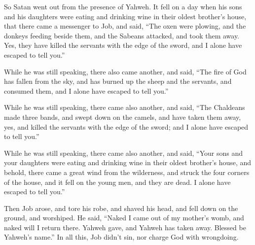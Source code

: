 {\par }{\PP So Satan went out from the presence of Yahweh.
It fell on a day when his sons and his daughters were eating and drinking wine in their oldest brother’s house,
that there came a messenger to Job, and said, “The oxen were plowing, and the donkeys feeding beside them,
and the Sabeans attacked, and took them away. Yes, they have killed the servants with the edge of the sword, and I alone have escaped to tell you.”
\par }{\PP {}While he was still speaking, there also came another, and said, “The fire of God has fallen from the sky, and has burned up the sheep and the servants, and consumed them, and I alone have escaped to tell you.”
\par }{\PP {}While he was still speaking, there came also another, and said, “The Chaldeans made three bands, and swept down on the camels, and have taken them away, yes, and killed the servants with the edge of the sword; and I alone have escaped to tell you.”
\par }{\PP {}While he was still speaking, there came also another, and said, “Your sons and your daughters were eating and drinking wine in their oldest brother’s house,
and behold, there came a great wind from the wilderness, and struck the four corners of the house, and it fell on the young men, and they are dead. I alone have escaped to tell you.”
\par }{\PP {}Then Job arose, and tore his robe, and shaved his head, and fell down on the ground, and worshiped.
He said, “Naked I came out of my mother’s womb, and naked will I return there. Yahweh gave, and Yahweh has taken away. Blessed be Yahweh’s name.”
In all this, Job didn’t sin, nor charge God with wrongdoing.

}
